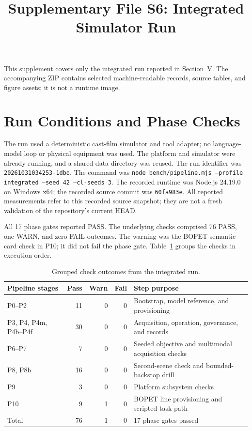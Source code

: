 \documentclass[journal]{IEEEtran}
\title{Supplementary File S6: Integrated Simulator Run}
\author{}
\begin{document}
\maketitle

\noindent This supplement covers only the integrated run reported in
Section~V. The accompanying ZIP contains selected machine-readable records,
source tables, and figure assets; it is not a runtime image.

\section{Run Conditions and Phase Checks}
The run used a deterministic cast-film simulator and tool adapter; no
language-model loop or physical equipment was used. The platform and
simulator were already running, and a shared data directory was reused. The
run identifier was \texttt{20261031034253-1dbo}. The command was
\texttt{node bench/pipeline.mjs --profile integrated --seed 42 --cl-seeds 3}.
The recorded runtime was Node.js 24.19.0 on Windows x64; the recorded source
commit was \texttt{60fa983e}.
All reported measurements refer to this recorded source snapshot; they are not
a fresh validation of the repository's current HEAD.

All 17 phase gates reported PASS. The underlying checks comprised 76 PASS,
one WARN, and zero FAIL outcomes. The warning was the BOPET semantic-card
check in P10; it did not fail the phase gate. Table~\ref{tab:s6-stages}
groups the checks in execution order.

\begin{table}[!t]
\centering
\caption{Grouped check outcomes from the integrated run.}
\label{tab:s6-stages}
\footnotesize
\setlength{\tabcolsep}{3pt}
\begin{tabularx}{\columnwidth}{@{}>{\raggedright\arraybackslash}p{2.65cm}r r r X@{}}
\toprule
Pipeline stages & Pass & Warn & Fail & Step purpose\\
\midrule
P0--P2 & 11 & 0 & 0 & Bootstrap, model reference, and provisioning\\
P3, P4, P4m, P4b--P4f & 30 & 0 & 0 & Acquisition, operation, governance, and records\\
P6--P7 & 7 & 0 & 0 & Seeded objective and multimodal acquisition checks\\
P8, P8b & 16 & 0 & 0 & Second-scene check and bounded-backstop drill\\
P9 & 3 & 0 & 0 & Platform subsystem checks\\
P10 & 9 & 1 & 0 & BOPET line provisioning and scripted task path\\
\midrule
Total & 76 & 1 & 0 & 17 phase gates passed\\
\bottomrule
\end{tabularx}
\end{table}
\end{document}
